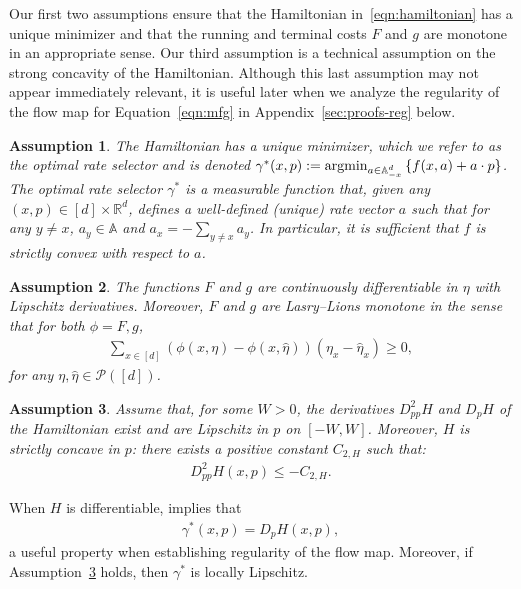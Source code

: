 \documentclass[11pt,reqno]{amsart}
\numberwithin{equation}{section}
\theoremstyle{plain}
\newtheorem{assumption}{Assumption}[section]
\newcommand{\A}{\mathbb{A}}
\newcommand{\argmin}{\mathop{\rm argmin}}
\newcommand{\1}{\boldsymbol{\mathbbm{1}}}
\begin{document}
Our first two assumptions ensure that the Hamiltonian in~\eqref{eqn:hamiltonian} has a unique minimizer and that the running and terminal costs $F$ and $g$ are monotone in an appropriate sense. Our third assumption is a technical assumption on the strong concavity of the Hamiltonian. Although this last assumption may not appear immediately relevant, it is useful later when we analyze the regularity of the flow map for Equation~\eqref{eqn:mfg} in Appendix~\ref{sec:proofs-reg} below.
\begin{assumption}
\label{asmp:hamiltonian-min}
The Hamiltonian has a unique minimizer, which we refer to as the {\rm optimal rate selector} and is denoted $\gamma^*(x, p) := \argmin_{a \in \A^d_{-x}} \left\{ f(x, a) + a \cdot p \right\}$. The optimal rate selector $\gamma^*$ is a measurable function that, given any $(x, p) \in [d] \times \mathbb{R}^d$, defines a well-defined (unique) rate vector $a$ such that for any $y \neq x$, $a_y \in \A$ and $a_x = -\sum_{y \neq x} a_y$. In particular, it is sufficient that $f$ is strictly convex with respect to $a$.
\end{assumption}
\begin{assumption}
\label{asmp:lip-mon}
The functions $F$ and $g$ are continuously differentiable in $\eta$ with Lipschitz derivatives. Moreover, $F$ and $g$ are Lasry--Lions monotone in the sense that for both $\phi = F, g$,
\begin{align}
    \sum_{x \in [d]} (\phi(x, \eta) - \phi(x, \hat{\eta})) (\eta_x - \hat{\eta}_x) \geq 0,
\end{align} 
for any $\eta, \hat{\eta} \in \mathcal{P}([d])$.     
\end{assumption}
\begin{assumption}
\label{asmp:hamiltonian-hess}
Assume that, for some $W > 0$, the derivatives $D^2_{pp}H$ and $D_p H$ of the Hamiltonian exist and are Lipschitz in $p$ on $[-W, W]$. Moreover, $H$ is strictly concave in $p$: there exists a positive constant $C_{2,H}$ such that:
\begin{align}
    D^2_{pp} H(x,p) \leq -C_{2,H}.
\end{align} 
\end{assumption}
When $H$ is differentiable, \cite[Proposition~1]{Gomes2013} implies that
\begin{align}
    \gamma^*(x,p) = D_p H(x,p),
\end{align}
a useful property when establishing regularity of the flow map. Moreover, if Assumption~\ref{asmp:hamiltonian-hess} holds, then $\gamma^*$ is locally Lipschitz.
\end{document}

